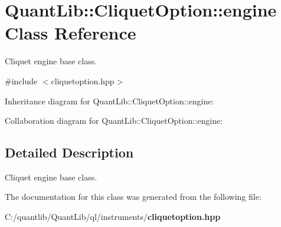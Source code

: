 \section{Quant\+Lib\+:\+:Cliquet\+Option\+:\+:engine Class Reference}
\label{class_quant_lib_1_1_cliquet_option_1_1engine}


Cliquet engine base class.  




{\ttfamily \#include $<$cliquetoption.\+hpp$>$}



Inheritance diagram for Quant\+Lib\+:\+:Cliquet\+Option\+:\+:engine\+:


Collaboration diagram for Quant\+Lib\+:\+:Cliquet\+Option\+:\+:engine\+:


\subsection{Detailed Description}
Cliquet engine base class. 

The documentation for this class was generated from the following file\+:\begin{DoxyCompactItemize}
\item 
C\+:/quantlib/\+Quant\+Lib/ql/instruments/{\bf cliquetoption.\+hpp}\end{DoxyCompactItemize}

